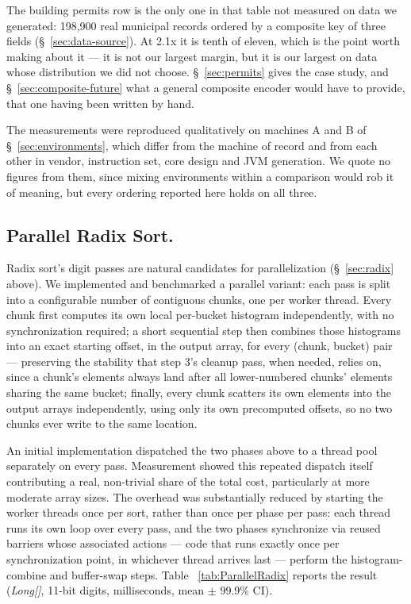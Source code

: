 \documentclass[twoside,leqno,twocolumn]{article}
\begin{document}
The building permits row is the only one in that table not measured on data we generated:
198,900 real municipal records ordered by a composite key of three fields (\S~\ref{sec:data-source}).
At 2.1x it is tenth of eleven, which is the point worth making about it --- it is not our largest
margin, but it is our largest on data whose distribution we did not choose.
\S~\ref{sec:permits} gives the case study, and \S~\ref{sec:composite-future} what a general
composite encoder would have to provide, that one having been written by hand.

The measurements were reproduced qualitatively on machines A and B of \S~\ref{sec:environments},
which differ from the machine of record and from each other in vendor, instruction set, core design and
JVM generation.
We quote no figures from them, since mixing environments within a comparison would rob it of meaning,
but every ordering reported here holds on all three.

\subsection{Parallel Radix Sort.}
\label{sec:parallel-radix}

Radix sort's digit passes are natural candidates for parallelization (\S~\ref{sec:radix} above).
We implemented and benchmarked a parallel variant:
each pass is split into a configurable number of contiguous chunks, one per worker thread.
Every chunk first computes its own local per-bucket histogram independently, with no synchronization required;
a short sequential step then combines those histograms into an exact starting offset, in the output array,
for every (chunk, bucket) pair — preserving the stability that step 3's cleanup pass, when needed, relies on,
since a chunk's elements always land after all lower-numbered chunks' elements sharing the same bucket;
finally, every chunk scatters its own elements into the output arrays independently,
using only its own precomputed offsets, so no two chunks ever write to the same location.

An initial implementation dispatched the two phases above to a thread pool separately on every pass.
Measurement showed this repeated dispatch itself contributing a real, non-trivial share of the total cost,
particularly at more moderate array sizes.
The overhead was substantially reduced by starting the worker threads once per sort,
rather than once per phase per pass:
each thread runs its own loop over every pass, and the two phases synchronize via reused barriers whose associated actions —
code that runs exactly once per synchronization point, in whichever thread arrives last —
perform the histogram-combine and buffer-swap steps.
Table ~\ref{tab:ParallelRadix} reports the result (\textit{Long[]}, 11-bit digits, milliseconds, mean $\pm$ 99.9\% CI).
\end{document}

